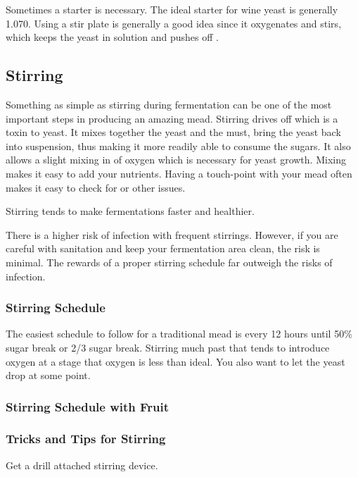\documentclass{article}
\begin{document}
  Sometimes a starter is necessary. The ideal starter for wine yeast is generally 1.070. Using a stir plate is 
  generally a good idea since it oxygenates and stirs, which keeps the yeast in solution and pushes off .

 \subsection{Stirring}
  Something as simple as stirring during fermentation can be one of the most important steps in producing an 
  amazing mead. Stirring drives off  which is a toxin to yeast. It mixes together the yeast and the must, 
  bring the yeast back into suspension, thus making it more readily able to consume the sugars. It also
  allows a slight mixing in of oxygen which is necessary for yeast growth. Mixing makes it easy to add your 
  nutrients. Having a touch-point with your mead often makes it easy to check for  or other issues.

  Stirring tends to make fermentations faster and healthier. 

  There is a higher risk of infection with frequent stirrings. However, if you are careful with sanitation and 
  keep your fermentation area clean, the risk is minimal. The rewards of a proper stirring schedule far outweigh 
  the risks of infection.

  \subsubsection{Stirring Schedule}
   The easiest schedule to follow for a traditional mead is every 12 hours until 50\% sugar break or 2/3 sugar 
   break. Stirring much past that tends to introduce
   oxygen at a stage that oxygen is less than ideal. You also want to let the yeast drop at some point.

  \subsubsection{Stirring Schedule with Fruit}

  \subsubsection{Tricks and Tips for Stirring}
   Get a drill attached stirring device.
\end{document}

